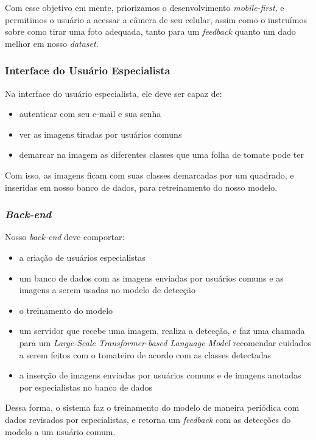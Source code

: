 Com esse objetivo em mente, priorizamos o desenvolvimento \textit{mobile-first}, e permitimos o usuário a acessar a câmera de seu celular, assim como o instruímos sobre como tirar uma foto adequada, tanto para um \textit{feedback} quanto um dado melhor em nosso \textit{dataset}.

\subsubsection{{Interface do Usuário Especialista} \label{sec:abst-esp}}

Na interface do usuário especialista, ele deve ser capaz de:

\begin{itemize}
    \item autenticar com seu e-mail e sua senha
    \item ver as imagens tiradas por usuários comuns
    \item demarcar na imagem as diferentes classes que uma folha de tomate pode ter
\end{itemize}

Com isso, as imagens ficam com suas classes demarcadas por um quadrado, e inseridas em nosso banco de dados, para retreinamento do nosso modelo. 

\subsubsection{{\emph{Back-end}}\label{sec:back-end-intro}}

Nosso \emph{back-end} deve comportar:

\begin{itemize}
    \item a criação de usuários especialistas
    \item um banco de dados com as imagens enviadas por usuários comuns e as imagens a serem usadas no modelo de detecção
    \item o treinamento do modelo
    \item um servidor que recebe uma imagem, realiza a detecção, e faz uma chamada para um \emph{Large-Scale Transformer-based Language Model} recomendar cuidados a serem feitos com o tomateiro de acordo com as classes detectadas
    \item a inserção de imagens enviadas por usuários comuns e de imagens anotadas por especialistas no banco de dados
\end{itemize}

Dessa forma, o sistema faz o treinamento do modelo de maneira periódica com dados revisados por especialistas, e retorna um \textit{feedback} com as detecções do modelo a um usuário comum.

